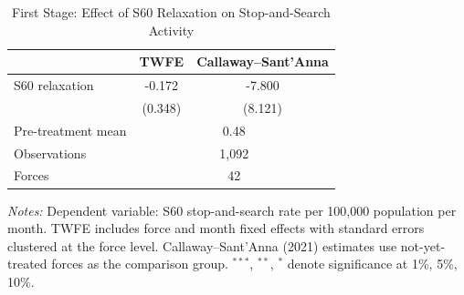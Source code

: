 \begin{table}[t]
\centering
\caption{First Stage: Effect of S60 Relaxation on Stop-and-Search Activity}
\label{tab:first_stage}
\begin{tabular}{lcc}
\hline\hline
 & TWFE & Callaway--Sant'Anna \\
\hline
\addlinespace
S60 relaxation & -0.172 & -7.800 \\
 & (0.348) & (8.121) \\
\addlinespace
Pre-treatment mean & \multicolumn{2}{c}{0.48} \\
Observations & \multicolumn{2}{c}{1,092} \\
Forces & \multicolumn{2}{c}{42} \\
\hline\hline
\end{tabular}
\begin{tablenotes}
\item \textit{Notes:} Dependent variable: S60 stop-and-search rate per 100,000 population per month. TWFE includes force and month fixed effects with standard errors clustered at the force level. Callaway--Sant'Anna (2021) estimates use not-yet-treated forces as the comparison group. $^{***}$, $^{**}$, $^{*}$ denote significance at 1\%, 5\%, 10\%.
\end{tablenotes}
\end{table}
